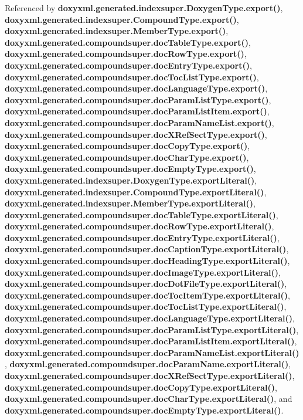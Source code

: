 Referenced by {\bf doxyxml.\+generated.\+indexsuper.\+Doxygen\+Type.\+export()}, {\bf doxyxml.\+generated.\+indexsuper.\+Compound\+Type.\+export()}, {\bf doxyxml.\+generated.\+indexsuper.\+Member\+Type.\+export()}, {\bf doxyxml.\+generated.\+compoundsuper.\+doc\+Table\+Type.\+export()}, {\bf doxyxml.\+generated.\+compoundsuper.\+doc\+Row\+Type.\+export()}, {\bf doxyxml.\+generated.\+compoundsuper.\+doc\+Entry\+Type.\+export()}, {\bf doxyxml.\+generated.\+compoundsuper.\+doc\+Toc\+List\+Type.\+export()}, {\bf doxyxml.\+generated.\+compoundsuper.\+doc\+Language\+Type.\+export()}, {\bf doxyxml.\+generated.\+compoundsuper.\+doc\+Param\+List\+Type.\+export()}, {\bf doxyxml.\+generated.\+compoundsuper.\+doc\+Param\+List\+Item.\+export()}, {\bf doxyxml.\+generated.\+compoundsuper.\+doc\+Param\+Name\+List.\+export()}, {\bf doxyxml.\+generated.\+compoundsuper.\+doc\+X\+Ref\+Sect\+Type.\+export()}, {\bf doxyxml.\+generated.\+compoundsuper.\+doc\+Copy\+Type.\+export()}, {\bf doxyxml.\+generated.\+compoundsuper.\+doc\+Char\+Type.\+export()}, {\bf doxyxml.\+generated.\+compoundsuper.\+doc\+Empty\+Type.\+export()}, {\bf doxyxml.\+generated.\+indexsuper.\+Doxygen\+Type.\+export\+Literal()}, {\bf doxyxml.\+generated.\+indexsuper.\+Compound\+Type.\+export\+Literal()}, {\bf doxyxml.\+generated.\+indexsuper.\+Member\+Type.\+export\+Literal()}, {\bf doxyxml.\+generated.\+compoundsuper.\+doc\+Table\+Type.\+export\+Literal()}, {\bf doxyxml.\+generated.\+compoundsuper.\+doc\+Row\+Type.\+export\+Literal()}, {\bf doxyxml.\+generated.\+compoundsuper.\+doc\+Entry\+Type.\+export\+Literal()}, {\bf doxyxml.\+generated.\+compoundsuper.\+doc\+Caption\+Type.\+export\+Literal()}, {\bf doxyxml.\+generated.\+compoundsuper.\+doc\+Heading\+Type.\+export\+Literal()}, {\bf doxyxml.\+generated.\+compoundsuper.\+doc\+Image\+Type.\+export\+Literal()}, {\bf doxyxml.\+generated.\+compoundsuper.\+doc\+Dot\+File\+Type.\+export\+Literal()}, {\bf doxyxml.\+generated.\+compoundsuper.\+doc\+Toc\+Item\+Type.\+export\+Literal()}, {\bf doxyxml.\+generated.\+compoundsuper.\+doc\+Toc\+List\+Type.\+export\+Literal()}, {\bf doxyxml.\+generated.\+compoundsuper.\+doc\+Language\+Type.\+export\+Literal()}, {\bf doxyxml.\+generated.\+compoundsuper.\+doc\+Param\+List\+Type.\+export\+Literal()}, {\bf doxyxml.\+generated.\+compoundsuper.\+doc\+Param\+List\+Item.\+export\+Literal()}, {\bf doxyxml.\+generated.\+compoundsuper.\+doc\+Param\+Name\+List.\+export\+Literal()}, {\bf doxyxml.\+generated.\+compoundsuper.\+doc\+Param\+Name.\+export\+Literal()}, {\bf doxyxml.\+generated.\+compoundsuper.\+doc\+X\+Ref\+Sect\+Type.\+export\+Literal()}, {\bf doxyxml.\+generated.\+compoundsuper.\+doc\+Copy\+Type.\+export\+Literal()}, {\bf doxyxml.\+generated.\+compoundsuper.\+doc\+Char\+Type.\+export\+Literal()}, and {\bf doxyxml.\+generated.\+compoundsuper.\+doc\+Empty\+Type.\+export\+Literal()}.



